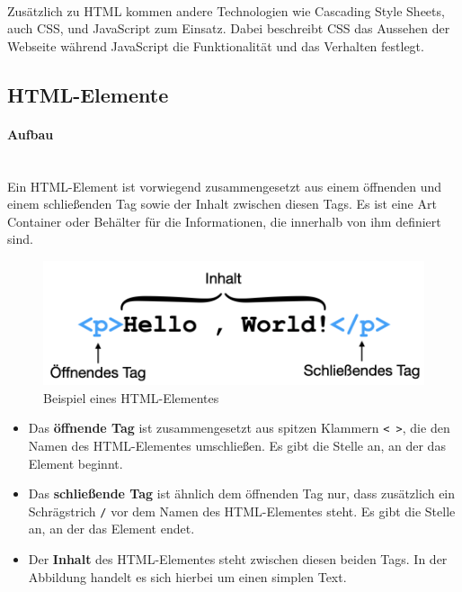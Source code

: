 \mbox{}\\
Zusätzlich zu HTML kommen andere Technologien wie Cascading Style Sheets, auch CSS, und JavaScript zum Einsatz. Dabei beschreibt CSS das Aussehen der Webseite während JavaScript die Funktionalität und das Verhalten festlegt. 

\subsection{HTML-Elemente}

\paragraph{Aufbau}

\mbox{}\\
Ein HTML-Element ist vorwiegend zusammengesetzt aus einem öffnenden und einem schließenden Tag sowie der Inhalt zwischen diesen Tags. Es ist eine Art Container oder Behälter für die Informationen, die innerhalb von ihm definiert sind.

\begin{figure}[H]
	\begin{center}
		\includegraphics[scale=.6]{images/html-element-example.png}
	\end{center}
		\caption{Beispiel eines HTML-Elementes}
\end{figure}

\begin{itemize}
	\item Das \textbf{öffnende Tag} ist zusammengesetzt aus spitzen Klammern \texttt{< >}, die den Namen des 
		HTML-Elementes 
		umschließen. Es gibt die Stelle an, an der das Element beginnt.
	\item Das \textbf{schließende Tag} ist ähnlich dem öffnenden Tag nur, dass zusätzlich ein Schrägstrich \texttt{/} vor dem
		Namen des HTML-Elementes steht. Es gibt die Stelle an, an der das Element endet. 
	\item Der \textbf{Inhalt} des HTML-Elementes steht zwischen diesen beiden Tags. In der Abbildung handelt es sich hierbei 
		um einen simplen Text.
\end{itemize}


